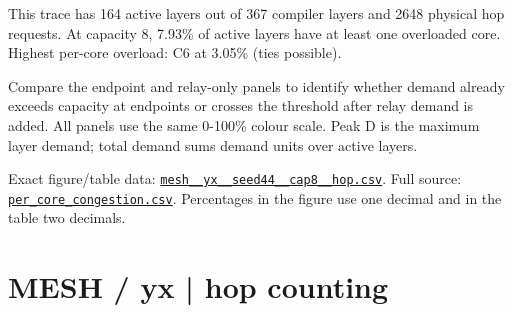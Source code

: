 \documentclass[10pt,a4paper]{article}
\begin{document}
This trace has 164 active layers out of 367 compiler layers and 2648 physical hop requests. At capacity 8, 7.93\% of active layers have at least one overloaded core. Highest per-core overload: C6 at 3.05\% (ties possible).\par
Compare the endpoint and relay-only panels to identify whether demand already exceeds capacity at endpoints or crosses the threshold after relay demand is added. All panels use the same 0-100\% colour scale. Peak D is the maximum layer demand; total demand sums demand units over active layers.\par
Exact figure/table data: \href{\detokenize{file:///home/dhruv-pansuriya/Documents/BTP/Compiler-Driven-ACE/output/pdf/qaoa_methods_congestion/tables/mesh__yx__seed44__cap8__hop.csv}}{\nolinkurl{mesh__yx__seed44__cap8__hop.csv}}. Full source: \href{\detokenize{file:///home/dhruv-pansuriya/Documents/BTP/Compiler-Driven-ACE/results/qaoa_2seed_2026-10-26/congestion/per_core_congestion.csv}}{\nolinkurl{per_core_congestion.csv}}. Percentages in the figure use one decimal and in the table two decimals.\par
\clearpage
\section*{MESH / yx | hop counting}
\end{document}

